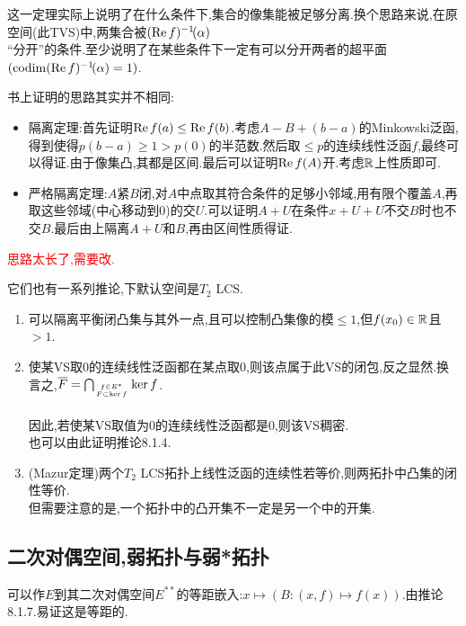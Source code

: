 \documentclass{article}
\begin{document}
这一定理实际上说明了在什么条件下,集合的像集能被足够分离.换个思路来说,在原空间(此TVS)中,两集合被$(\operatorname{Re} f)^{-1}\! (\alpha)$\\``分开''的条件.至少说明了在某些条件下一定有可以分开两者的超平面$(\operatorname{codim} (\operatorname{Re} f)^{-1}\! (\alpha)=1)$.

书上证明的思路其实并不相同:\begin{itemize}
    \item 隔离定理:首先证明$\operatorname{Re} f(a)\leq \operatorname{Re} f(b)$.考虑$A-B+(b-a)$的Minkowski泛函,得到使得$p(b-a)\geq 1>p(0)$的半范数.然后取$\leq p$的连续线性泛函$f$,最终可以得证.由于像集凸,其都是区间.最后可以证明$\operatorname{Re} f(A)$开.考虑$\mathbb{R}$上性质即可.
    \item 严格隔离定理:$A$紧$B$闭,对$A$中点取其符合条件的足够小邻域,用有限个覆盖$A$,再取这些邻域(中心移动到0)的交$U$.可以证明$A+U$在条件$x+U+U$不交$B$时也不交$B$.最后由上隔离$A+U$和$B$,再由区间性质得证.
\end{itemize}
\textcolor{red}{思路太长了,需要改.}

它们也有一系列推论,下默认空间是$T_2$ LCS.
\begin{enumerate}[resume]
    \item 可以隔离平衡闭凸集与其外一点,且可以控制凸集像的模$\leq 1$,但$f(x_0)\in \mathbb{R}$且$>1$.\\
    \item 使某VS取0的连续线性泛函都在某点取0,则该点属于此VS的闭包,反之显然.换言之,$\overline{F}=\bigcap_{f\in E^*\atop F\subset \ker f}\ker f$.\\
    \\
    因此,若使某VS取值为0的连续线性泛函都是0,则该VS稠密.\\
    也可以由此证明推论8.1.4.
    \item (Mazur定理)两个$T_2$ LCS拓扑上线性泛函的连续性若等价,则两拓扑中凸集的闭性等价.\\但需要注意的是,一个拓扑中的凸开集不一定是另一个中的开集.
\end{enumerate}

\subsection{二次对偶空间,弱拓扑与弱*拓扑}
可以作$E$到其二次对偶空间$E^{**}$的等距嵌入:$x\mapsto (B:(x,f)\mapsto f(x))$.由推论8.1.7.易证这是等距的.
\end{document}
